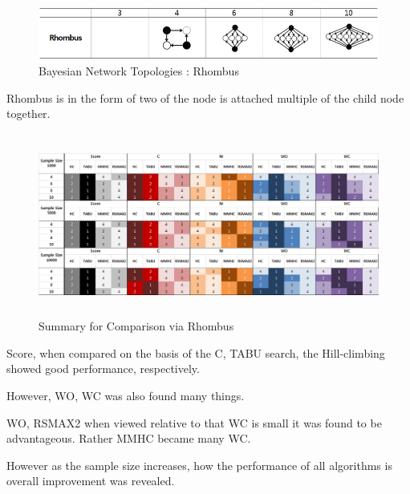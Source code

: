 	\begin{figure}[h]
	\centering
		\includegraphics[height=50pt]{Topologies_Rhombus}
		\caption{Bayesian Network Topologies : Rhombus}
	\end{figure}	

	Rhombus is in the form of two of the node is attached multiple of the child node together.

\begin{figure}[!bhp]
	\centering
		\includegraphics[height=170pt]{Result_Rhombus}
		\caption{Summary for Comparison via Rhombus}
	\end{figure}	

Score, when compared on the basis of the C, TABU search, the Hill-climbing showed good performance, respectively.

However, WO, WC was also found many things.

WO, RSMAX2 when viewed relative to that WC is small it was found to be advantageous. Rather MMHC became many WC.

However as the sample size increases, how the performance of all algorithms is overall improvement was revealed.
	
